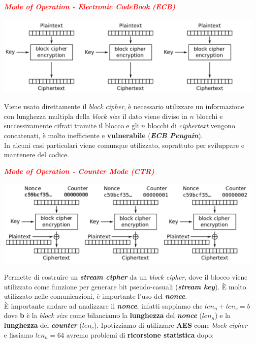 \begin{flushleft}
    \textcolor{red}{\textbf{\textit{Mode of Operation - Electronic CodeBook (ECB)}}}

    {\centering
        \includegraphics[width=\textwidth]{img/ecb.png}
    \par}

    Viene usato direttamente il \textit{block cipher}, è necessario utilizzare un informazione con lunghezza multipla della \textit{block size} il dato viene diviso in $n$ blocchi e successivamente cifrati tramite il blocco e gli $n$ blocchi di \textit{ciphertext} vengono concatenati, è molto inefficiente e \textbf{vulnerabile} (\textbf{\textit{ECB Penguin}}). \\
    In alcuni casi particolari viene comunque utilizzato, soprattuto per sviluppare e mantenere del codice.

    \textcolor{red}{\textbf{\textit{Mode of Operation - Counter Mode (CTR)}}}


    {\centering
        \includegraphics[width=\textwidth]{img/ctr.png}
    \par}

    Permette di costruire un \textbf{\textit{stream cipher}} da un \textit{block cipher}, dove il blocco viene utilizzato come funzione per generare bit pseudo-casuali (\textbf{\textit{stream key}}). È molto utilizzato nelle comunicazioni, è importante l'uso del \textbf{\textit{nonce}}. \\
    È importante andare ad analizzare il \textbf{\textit{nonce}}, infatti sappiamo che $len_n + len_c = b$ dove \textbf{b} è la \textit{block size} come bilanciamo la \textbf{lunghezza} del \textbf{\textit{nonce}} ($len_n$) e la \textbf{lunghezza} del \textbf{\textit{counter}} ($len_c$). Ipotizziamo di utilizzare \textbf{AES} come \textit{block cipher} e fissiamo $len_n = 64$ avremo problemi di \textbf{ricorsione statistica} dopo:
    

\end{flushleft}
